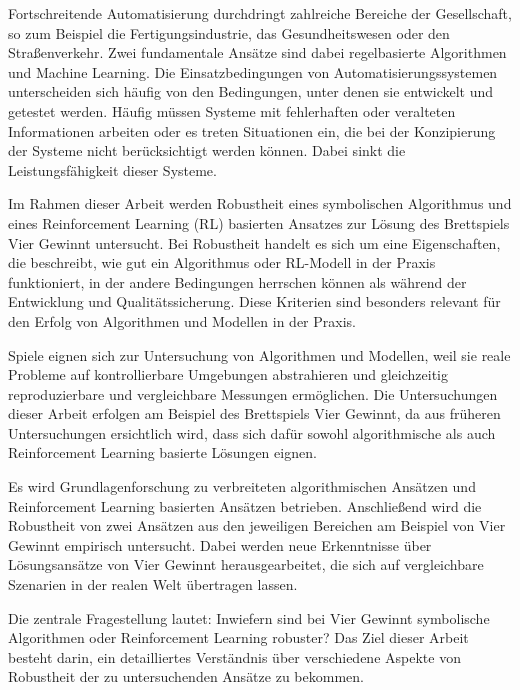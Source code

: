 Fortschreitende Automatisierung durchdringt zahlreiche Bereiche der Gesellschaft, so zum Beispiel die Fertigungsindustrie, das Gesundheitswesen oder den Straßenverkehr. Zwei fundamentale Ansätze sind dabei regelbasierte Algorithmen und Machine Learning. Die Einsatzbedingungen von Automatisierungssystemen unterscheiden sich häufig von den Bedingungen, unter denen sie entwickelt und getestet werden. Häufig müssen Systeme mit fehlerhaften oder veralteten Informationen arbeiten oder es treten Situationen ein, die bei der Konzipierung der Systeme nicht berücksichtigt werden können. Dabei sinkt die Leistungsfähigkeit dieser Systeme.

Im Rahmen dieser Arbeit werden Robustheit eines symbolischen Algorithmus und eines Reinforcement Learning (RL) basierten Ansatzes zur Lösung des Brettspiels \glqq Vier Gewinnt\grqq{} untersucht. Bei Robustheit handelt es sich um eine Eigenschaften, die beschreibt, wie gut ein Algorithmus oder RL-Modell in der Praxis funktioniert, in der andere Bedingungen herrschen können als während der Entwicklung und Qualitätssicherung. Diese Kriterien sind besonders relevant für den Erfolg von Algorithmen und Modellen in der Praxis.

Spiele eignen sich zur Untersuchung von Algorithmen und Modellen, weil sie reale Probleme auf kontrollierbare Umgebungen abstrahieren und gleichzeitig reproduzierbare und vergleichbare Messungen ermöglichen. Die Untersuchungen dieser Arbeit erfolgen am Beispiel des Brettspiels \glqq Vier Gewinnt\grqq{}, da aus früheren Untersuchungen ersichtlich wird, dass sich dafür sowohl algorithmische als auch Reinforcement Learning basierte Lösungen eignen.

Es wird Grundlagenforschung zu verbreiteten algorithmischen Ansätzen und Reinforcement Learning basierten Ansätzen betrieben. Anschließend wird die Robustheit von zwei Ansätzen aus den jeweiligen Bereichen am Beispiel von Vier Gewinnt empirisch untersucht. Dabei werden neue Erkenntnisse über Lösungsansätze von Vier Gewinnt herausgearbeitet, die sich auf vergleichbare Szenarien in der realen Welt übertragen lassen.

Die zentrale Fragestellung lautet: Inwiefern sind bei Vier Gewinnt symbolische Algorithmen oder Reinforcement Learning robuster? Das Ziel dieser Arbeit besteht darin, ein detailliertes Verständnis über verschiedene Aspekte von Robustheit der zu untersuchenden Ansätze zu bekommen.
